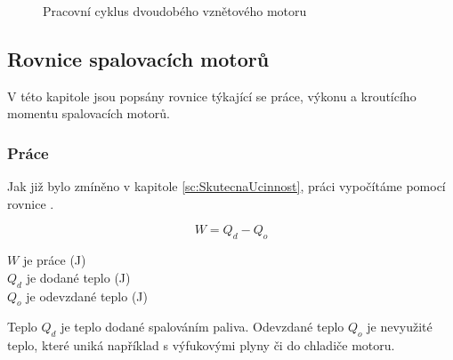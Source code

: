 \begin{figure}[H]
    
    \caption{Pracovní cyklus dvoudobého vznětového motoru \jaDiag}
    \label{obr:PracovniCyklusDvoudobehoVznetovehoMotoru}
\end{figure}

\newpage

\subsection{Rovnice spalovacích motorů}
{V této kapitole jsou popsány rovnice týkající se práce, výkonu a kroutícího momentu spalovacích motorů.}

\subsubsection{Práce}
{Jak již bylo zmíněno v kapitole \ref{sc:SkutecnaUcinnost}, práci vypočítáme pomocí rovnice .}
\cite{NCEPU:ThermalEfficiencyForHeatEngines}

\begin{equation}\label{rv:prace2}
    W=Q_d-Q_o
\end{equation}

{\(W\) je práce (J)}\\
{\(Q_d\) je dodané teplo (J)}\\
{\(Q_o\) je odevzdané teplo (J)}\odst

{Teplo \(Q_d\) je teplo dodané spalováním paliva. Odevzdané teplo \(Q_o\) je nevyužité teplo, které uniká například s výfukovými plyny či do chladiče motoru.}

